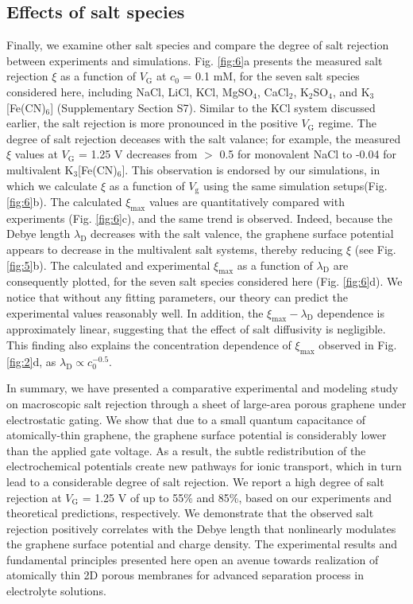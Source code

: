 \documentclass[journal=langd5,email=true, hyperref=true, keywords=false]{achemso}
\newcommand{\Fig}{Fig.}
\begin{document}
\subsection{Effects of salt species}
\label{sec:salts}

Finally, we examine other salt species and compare the degree of salt
rejection between experiments and simulations. \Fig{} \ref{fig:6}a
presents the measured salt rejection $\xi$ as a function of
$V_{\mathrm{G}}$ at $c_{0}$ = 0.1 mM, for the seven salt species
considered here, including NaCl, LiCl, KCl, MgSO$_{4}$, CaCl$_{2}$,
K$_{2}$SO$_{4}$, and K$_{3}$[Fe(CN)$_{6}$] (Supplementary
Section S7). Similar to the KCl system discussed earlier, the salt
rejection is more pronounced in the positive $V_{\mathrm{G}}$
regime. The degree of salt rejection deceases with the salt valance;
for example, the measured $\xi$ values at $V_{\mathrm{G}}$ = 1.25 V
decreases from $>$ 0.5 for monovalent NaCl to -0.04 for multivalent
K$_{3}$[Fe(CN)$_{6}$]. This observation is endorsed by our simulations,
in which we calculate $\xi$ as a function of $V_{\mathrm{g}}$ using
the same simulation setups(\Fig{} \ref{fig:6}b). The calculated
$\xi_{\mathrm{max}}$ values are quantitatively compared with
experiments (\Fig{} \ref{fig:6}c), and the same trend is
observed. Indeed, because the Debye length
$\lambda_{\mathrm{D}}$ decreases with the salt valence, the graphene
surface potential appears to decrease in the multivalent salt systems,
thereby reducing $\xi$ (see \Fig{} \ref{fig:5}b). The calculated and
experimental $\xi_{\mathrm{max}}$ as a function of
$\lambda_{\mathrm{D}}$ are consequently plotted, for the seven salt
species considered here (\Fig{} \ref{fig:6}d). We notice that without
any fitting parameters, our theory can predict the experimental values
reasonably well. In addition, the
$\xi_{\mathrm{max}}-\lambda_{\mathrm{D}}$ dependence is approximately
linear, suggesting that the effect of salt diffusivity is
negligible. This finding also explains the concentration dependence of
$\xi_{\mathrm{max}}$ observed in \Fig{} \ref{fig:2}d, as
$\lambda_{\mathrm{D}} \propto c_{0}^{-0.5}$.


In summary, we have presented a comparative experimental and modeling
study on macroscopic salt rejection through a sheet of large-area
porous graphene under electrostatic gating. We show that due to a
small quantum capacitance of atomically-thin graphene, the graphene
surface potential is considerably lower than the applied gate
voltage. As a result, the subtle redistribution of the electrochemical
potentials create new pathways for ionic transport, which in turn lead
to a considerable degree of salt rejection. We report a high degree of
salt rejection at $V_{\mathrm{G}}$ = 1.25 V of up to 55\% and 85\%,
based on our experiments and theoretical predictions, respectively. We
demonstrate that the observed salt rejection positively correlates
with the Debye length that nonlinearly modulates the graphene surface
potential and charge density. The experimental results and fundamental
principles presented here open an avenue towards realization of
atomically thin 2D porous membranes for advanced separation process in
electrolyte solutions.
\end{document}
